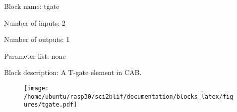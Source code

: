 \pagebreak

Block name: tgate

Number of inputs: 2

Number of outputs: 1

Parameter list: none

Block description: 
A T-gate element in CAB.

\begin{figure}[H]  %
\texttt{[image: /home/ubuntu/rasp30/sci2blif/documentation/blocks\_latex/figures/tgate.pdf]}
\end{figure}

